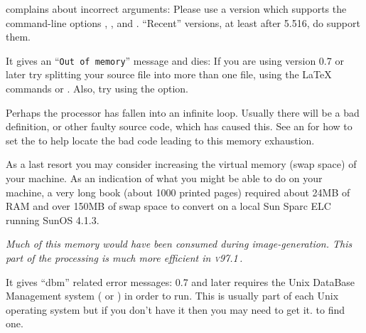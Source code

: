 \begin{htmllist}
\item [\fn{dvips} complains about incorrect arguments:\label{dvips} ]
Please use a version which supports the command-line options , ,
 and . ``Recent'' versions, at least after 5.516, do support them.


\item [It gives an ``\texttt{Out of memory}'' message and dies: ]
If you are using version \latextohtml{} 0.7 or later try splitting your
source file into more than one file, using the \LaTeX{}
commands  or .
Also, try using the  option.

\begin{changebar}
Perhaps the processor has fallen into an infinite loop.
Usually there will be a bad definition, or other faulty source code,
which has caused this.
See an  for
how to set the   to
help locate the bad code leading to this memory exhaustion.
\end{changebar}%

As a last resort you may consider increasing the virtual memory
(swap space) of your machine. As an indication
of what you might be able to do on your machine,
a very long book (about 1000 printed pages) required about
24MB of RAM and over 150MB of swap space to convert on a local Sun Sparc ELC
running SunOS 4.1.3.
\begin{changebar}
\newline\textit
{Much of this memory would have been consumed during image-generation.
This part of the processing is much more efficient in \textsc{v97.1}\,.}
\end{changebar}%


\item [It gives ``dbm'' related error messages: ]
\latextohtml{} 0.7 and later requires the
Unix DataBase Management system ( or ) in order to run.
This is usually part of each Unix operating system but if you
don't have it then you may need to get it.
to find one.


\end{htmllist}
